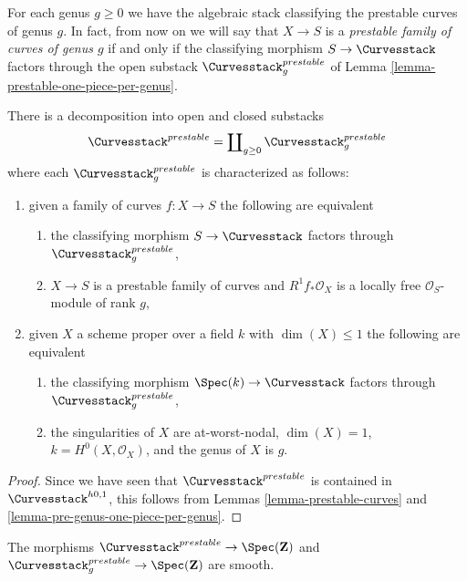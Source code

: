 \noindent
For each genus $g \geq 0$ we have the algebraic stack classifying
the prestable curves of genus $g$. In fact, from now on we will say
that $X \to S$ is a {\it prestable family of curves of genus $g$}
if and only if the classifying morphism $S \to \Curvesstack$ factors through
the open substack $\Curvesstack^{prestable}_g$ of
Lemma \ref{lemma-prestable-one-piece-per-genus}.

\begin{lemma}
\label{lemma-prestable-one-piece-per-genus}
There is a decomposition into open and closed substacks
$$
\Curvesstack^{prestable} = \coprod\nolimits_{g \geq 0}
\Curvesstack^{prestable}_g
$$
where each $\Curvesstack^{prestable}_g$ is characterized as follows:
\begin{enumerate}
\item given a family of curves $f : X \to S$ the following are equivalent
\begin{enumerate}
\item the classifying morphism $S \to \Curvesstack$ factors
through $\Curvesstack^{prestable}_g$,
\item $X \to S$ is a prestable family of curves and
$R^1f_*\mathcal{O}_X$ is a locally free $\mathcal{O}_S$-module of rank $g$,
\end{enumerate}
\item given $X$ a scheme proper over a field $k$ with
$\dim(X) \leq 1$ the following are equivalent
\begin{enumerate}
\item the classifying morphism $\Spec(k) \to \Curvesstack$
factors through $\Curvesstack^{prestable}_g$,
\item the singularities of $X$ are at-worst-nodal, $\dim(X) = 1$,
$k = H^0(X, \mathcal{O}_X)$, and the genus of $X$ is $g$.
\end{enumerate}
\end{enumerate}
\end{lemma}

\begin{proof}
Since we have seen that $\Curvesstack^{prestable}$ is contained
in $\Curvesstack^{h0, 1}$, this
follows from Lemmas \ref{lemma-prestable-curves} and
\ref{lemma-pre-genus-one-piece-per-genus}.
\end{proof}

\begin{lemma}
\label{lemma-prestable-curves-smooth}
The morphisms
$\Curvesstack^{prestable} \to \Spec(\mathbf{Z})$ and
$\Curvesstack^{prestable}_g \to \Spec(\mathbf{Z})$ are
smooth.
\end{lemma}

